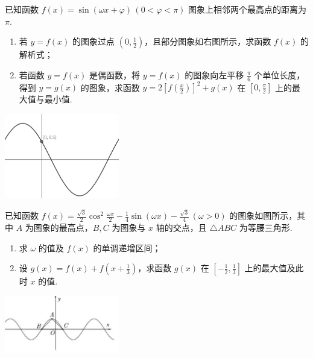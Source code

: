 \documentclass[a4paper , final]{ctexart}
\newenvironment{problemwithfig}[3][2cm]{%
  \item #2
  \par\noindent
  \begin{minipage}[t][8cm][b]{\linewidth}
    \vfill
    \hfill #3
    \par\vspace{#1} %
  \end{minipage}
}{}
\begin{document}
\begin{problems}
    \begin{problemwithfig}[5cm]
  {
    已知函数 $f(x) = \sin(\omega x + \varphi)\,(0 < \varphi < \pi)$ 图象上相邻两个最高点的距离为 $\pi$.

    \begin{enumerate}[label=(\arabic*)]
      \item 若 $y=f(x)$ 的图象过点 $(0, \frac{1}{2})$，且部分图象如右图所示，求函数 $f(x)$ 的解析式；
      \item 若函数 $y=f(x)$ 是偶函数，将 $y=f(x)$ 的图象向左平移 $\frac{\pi}{6}$ 个单位长度，得到 $y=g(x)$ 的图象，求函数 $y = 2\left[f\left(\frac{x}{2}\right)\right]^2 + g(x)$ 在 $[0, \frac{\pi}{2}]$ 上的最大值与最小值.
    \end{enumerate}
  }
  {
    \includegraphics[width=5cm]{Snipaste_2025-07-22_23-03-20.png}
  }
\end{problemwithfig}

\begin{problemwithfig}[5cm]
  {
    已知函数 $f(x) = \frac{\sqrt{3}}{2}\cos^2\frac{\omega x}{2} - \frac{1}{4}\sin(\omega x) - \frac{\sqrt{3}}{4}\,(\omega > 0)$ 的图象如图所示，其中 $A$ 为图象的最高点，$B, C$ 为图象与 $x$ 轴的交点，且 $\triangle ABC$ 为等腰三角形.
    
    \begin{enumerate}[label=(\arabic*)]
      \item 求 $\omega$ 的值及 $f(x)$ 的单调递增区间；
      \item 设 $g(x) = f(x) + f(x+\frac{1}{3})$，求函数 $g(x)$ 在 $[-\frac{1}{2}, \frac{1}{3}]$ 上的最大值及此时 $x$ 的值.
    \end{enumerate}
  }
  {
    \includegraphics[width=5cm]{Snipaste_2025-07-22_23-11-22.png}
  }
\end{problemwithfig}


\end{problems}
\end{document}
